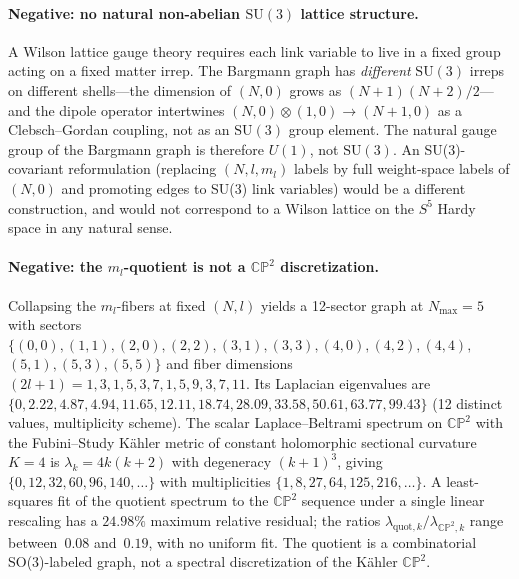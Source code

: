 \documentclass[aps,pra,twocolumn,superscriptaddress,longbibliography]{revtex4-2}
\begin{document}
\paragraph*{Negative: no natural non-abelian $\mathrm{SU}(3)$
lattice structure.} A Wilson lattice gauge theory requires each
link variable to live in a fixed group acting on a fixed matter
irrep.  The Bargmann graph has \emph{different} $\mathrm{SU}(3)$
irreps on different shells---the dimension of $(N, 0)$ grows as
$(N+1)(N+2)/2$---and the dipole operator intertwines
$(N, 0) \otimes (1, 0) \to (N+1, 0)$ as a Clebsch--Gordan
coupling, not as an $\mathrm{SU}(3)$ group element.  The natural
gauge group of the Bargmann graph is therefore $U(1)$, not
$\mathrm{SU}(3)$.  An SU(3)-covariant reformulation
(replacing $(N, l, m_l)$ labels by full weight-space labels of
$(N, 0)$ and promoting edges to SU(3) link variables) would be a
different construction, and would not correspond to a Wilson
lattice on the $S^5$ Hardy space in any natural sense.

\paragraph*{Negative: the $m_l$-quotient is not a $\mathbb{CP}^2$
discretization.} Collapsing the $m_l$-fibers at fixed $(N, l)$
yields a 12-sector graph at $N_{\max} = 5$ with sectors
$\{(0,0), (1,1), (2,0), (2,2), (3,1), (3,3), (4,0), (4,2), (4,4),$
$(5,1), (5,3), (5,5)\}$ and fiber dimensions $(2l+1) = 1, 3, 1, 5,
3, 7, 1, 5, 9, 3, 7, 11$.  Its Laplacian eigenvalues are
$\{0, 2.22, 4.87, 4.94, 11.65, 12.11, 18.74, 28.09, 33.58, 50.61,
63.77, 99.43\}$ (12 distinct values, multiplicity scheme).  The
scalar Laplace--Beltrami spectrum on $\mathbb{CP}^2$ with the
Fubini--Study K\"ahler metric of constant holomorphic sectional
curvature~$K = 4$ is
$\lambda_k = 4k(k+2)$ with degeneracy $(k+1)^3$, giving
$\{0, 12, 32, 60, 96, 140, \ldots\}$ with multiplicities
$\{1, 8, 27, 64, 125, 216, \ldots\}$.  A least-squares fit of the
quotient spectrum to the $\mathbb{CP}^2$ sequence under a single
linear rescaling has a $24.98\%$ maximum relative residual; the
ratios $\lambda_{\text{quot},k} / \lambda_{\mathbb{CP}^2, k}$ range
between~$0.08$ and~$0.19$, with no uniform fit.  The quotient is a
combinatorial SO(3)-labeled graph, not a spectral discretization
of the Kähler $\mathbb{CP}^2$.
\end{document}
